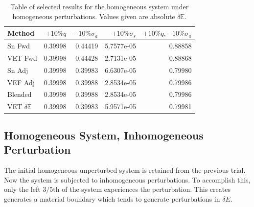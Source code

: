 \documentclass[12pt]{report}
\newcommand{\Edd}{\mathbb{E}}
\newcommand{\sigs}{\sigma_s}
\newcommand{\siga}{\sigma_a}
\begin{document}
\begin{table}[H]
\label{TableT1}
\centering
  \begin{tabular}{| l | r | r | r | r |}
    \hline
    Method  &  $+10\% q $  & $-10\% \siga $ & $+10\% \sigs $ & $+10\% q,-10\% \siga$ \\ \hline
     Sn Fwd 			&0.39998 &0.44419 &5.7577e-05 & 0.88858\\ \hline
     VET Fwd			&0.39998 &0.44428 &2.7131e-05 &0.88868\\ \hline
     Sn Adj			&0.39998 &0.39983 &6.6307e-05 &0.79980\\ \hline
     VEF Adj 			&0.39998 &0.39988 &2.8534e-05 &0.79986\\ \hline
     Blended 			&0.39998 &0.39988 &2.8534e-05 &0.79986\\ \hline
     VET $\delta \Edd$ 	&0.39998 &0.39983 &5.9571e-05 &0.79981\\ \hline
    \end{tabular}
  \caption{Table of selected results for the homogeneous system under homogeneous perturbations. Values given are absolute $\delta \Edd$. }
\end{table}


\subsection{Homogeneous System, Inhomogeneous Perturbation}
The initial homogeneous unperturbed system is retained from the previous trial. Now the system is subjected to inhomogeneous perturbations. To accomplish this, only the left $3/5$th of the system experiences the perturbation. This creates generates a material boundary which tends to generate perturbations in $\delta E$.
\end{document}
